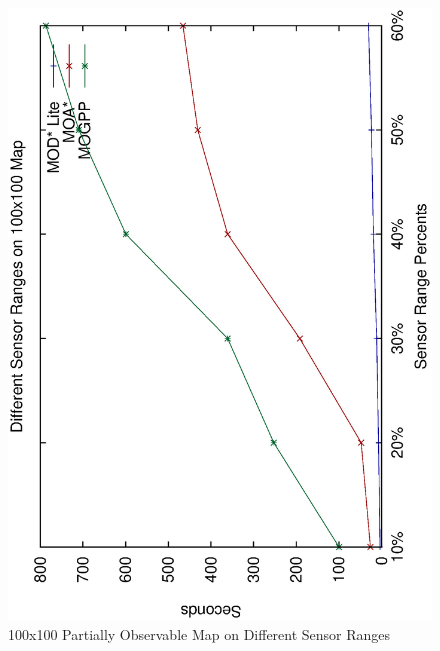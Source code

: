 \documentclass[10pt,journal]{IEEEtran}
\begin{document}
\begin{figure}
\centering
\includegraphics[scale=0.3]{experimental/100x100_partially_normal}
\caption{100x100 Partially Observable Map on Different Sensor Ranges}
\label{fig:100x100sensor}
\end{figure}
\end{document}
